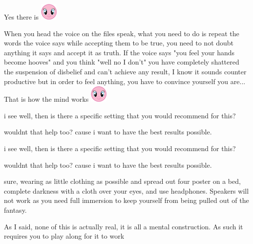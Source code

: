 \documentclass[ebook,12pt,oneside,openany]{memoir}
\newcommand{\mytexttilde}{\raisebox{0.5ex}{\texttildelow}}
\begin{document}
\begin{tcolorbox}[title=Toby]
\begin{tcolorbox}[title=\mytexttilde{}Lawful Sturdy Wing\mytexttilde{}]
\par{Yes there is \includegraphics{images/mlp_smile.png}}
\par{When you head the voice on the files speak, what you need to do is repeat the words the voice says while accepting them to be true, you need to not doubt anything it says and accept it as truth. If the voice says "you feel your hands become hooves" and you think "well no I don't" you have completely shattered the suspension of disbelief and can't achieve any result, I know it sounds counter productive but in order to feel anything, you have to convince yourself you are... That is how the mind works \includegraphics{images/mlp_smile.png}}
\end{tcolorbox}
\par{i see well, then is there a specific setting that you would recommend for this?}
\par{  wouldnt that help too? cause i want to have the best results possible. }
\end{tcolorbox}
\begin{tcolorbox}[title=\mytexttilde{}Lawful Sturdy Wing\mytexttilde{},colback=magenta!5!white,colframe=magenta!75!black,coltitle=white]
\begin{tcolorbox}[title=Toby]
\par{i see well, then is there a specific setting that you would recommend for this?}
\par{  wouldnt that help too? cause i want to have the best results possible. }
\end{tcolorbox}
\par{sure, wearing as little clothing as possible and spread out four poster on a bed, complete darkness with a cloth over your eyes, and use headphones. Speakers will not work as you need full immersion to keep yourself from being pulled out of the fantasy.}
\newline{}
\par{As I said, none of this is actually real, it is all a mental construction. As such it requires you to play along for it to work}
\end{tcolorbox}
\end{document}
